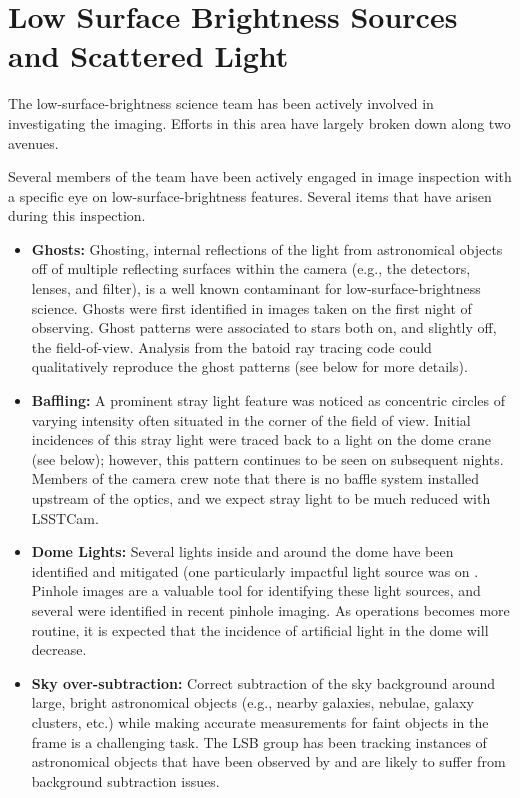 \section{Low Surface Brightness Sources and Scattered Light}
\label{sec:low_surface_brightness}

The low-surface-brightness science team has been actively involved in investigating the \ComCam imaging. Efforts in this area have largely broken down along two avenues.

 Several members of the team have been actively engaged in image inspection with a specific eye on low-surface-brightness features. Several items that have arisen during this inspection. 

\begin{itemize}
\item {\bf Ghosts:} Ghosting, internal reflections of the light from astronomical objects off of multiple reflecting surfaces within the camera (e.g., the detectors, lenses, and filter), is a well known contaminant for low-surface-brightness science. Ghosts were first identified in images taken on the first night of \ComCam observing. Ghost patterns were associated to stars both on, and slightly off, the \ComCam field-of-view. Analysis from the batoid ray tracing code could qualitatively reproduce the ghost patterns (see below for more details).

\item {\bf Baffling:} A prominent stray light feature was noticed as concentric circles of varying intensity often situated in the corner of the \ComCam field of view. Initial incidences of this stray light were traced back to a light on the dome crane (see below); however, this pattern continues to be seen on subsequent nights.   Members of the camera crew note that there is no baffle system installed upstream of the \ComCam optics, and we expect stray light to be much reduced with LSSTCam.

\item {\bf Dome Lights:} Several lights inside and around the dome have been identified and mitigated (one particularly impactful light source was on . Pinhole images are a valuable tool for identifying these light sources, and several were identified in recent pinhole imaging. As operations becomes more routine, it is expected that the incidence of artificial light in the dome will decrease.

\item {\bf Sky over-subtraction:} Correct subtraction of the sky background around large, bright astronomical
  objects (e.g., nearby galaxies, nebulae, galaxy clusters, etc.) while making accurate measurements for faint
  objects in the frame is a challenging task. The LSB group has been tracking instances of astronomical objects that have been observed by \ComCam and are likely to suffer from background subtraction issues.


\end{itemize}
